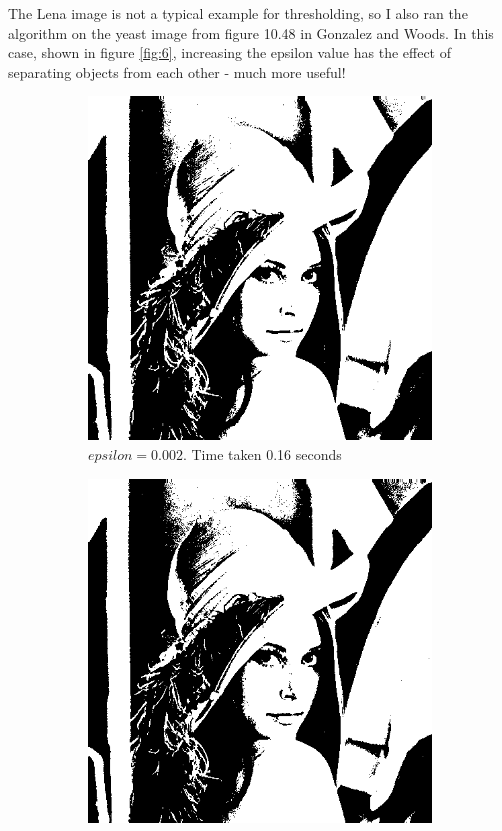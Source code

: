 \documentclass[a4paper]{article}
\begin{document}
The Lena image is not a typical example for thresholding, so I also ran the algorithm on the yeast image from figure 10.48 in Gonzalez and Woods. In this case, shown in figure \ref{fig:6}, increasing the epsilon value has the effect of separating objects from each other - much more useful!
\begin{figure}[h]
    
        \centering
        \begin{subfigure}[b]{0.25\textwidth}
                \centering
                \includegraphics[width=\textwidth]{q3-lena-0002.png}
                \caption{$epsilon=0.002$. Time taken 0.16 seconds}
                \label{fig:5a}
        \end{subfigure}
        \begin{subfigure}[b]{0.25\textwidth}
                \centering
                \includegraphics[width=\textwidth]{q3-lena-002.png}

\end{subfigure}
\end{figure}
\end{document}

